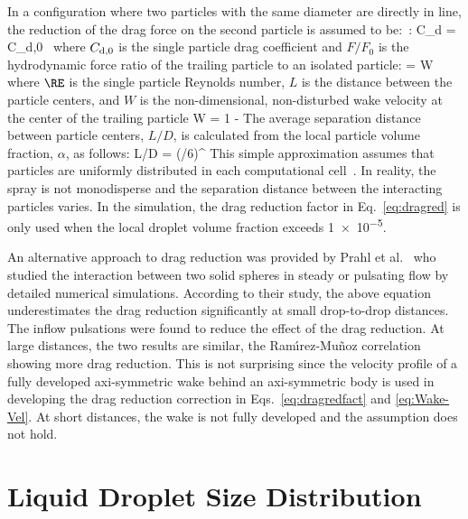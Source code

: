 In a configuration where two particles with the same diameter are directly in line, the reduction of the drag force on the second particle is assumed to be:~\cite{Ramirez:1}:
\be
  C_{\rm d} = C_{\rm d,0} \,  \label{eq:dragred}
\ee
where $C_{\rm d,0}$ is the single particle drag coefficient and $F / F_0$ is the hydrodynamic force ratio of the trailing particle to an isolated particle:
\be
   = W  \label{eq:dragredfact}
\ee
where $\RE$ is the single particle Reynolds number, $L$ is the distance between the particle centers, and $W$ is the non-dimensional, non-disturbed wake velocity at the center of the trailing particle
\be
  W = 1 -   \label{eq:Wake-Vel}
\ee
The average separation distance between particle centers, $L/D$, is calculated from the local particle volume fraction, $\alpha$, as follows:
\be
  L/D = \left(\pi/6\alpha \right)^{}
\ee
This simple approximation assumes that particles are uniformly distributed in each computational cell~\cite{Bhattacharyya2008}. In reality, the spray is not monodisperse and the separation distance between the interacting particles varies. In the simulation, the drag reduction factor in Eq.~\ref{eq:dragred} is only used when the local droplet volume fraction exceeds \num{1e-5}.

An alternative approach to drag reduction was provided by Prahl et al.~\cite{Prahl:1} who studied the interaction between two solid spheres in steady or pulsating flow by detailed numerical simulations. According to their study, the above equation underestimates the drag reduction significantly at small drop-to-drop distances. The inflow pulsations were found to reduce the effect of the drag reduction. At large distances, the two results are similar, the Ram\'{\i}rez-Mu\~{n}oz correlation showing more drag reduction. This is not surprising since the velocity profile of a fully developed axi-symmetric wake behind an axi-symmetric body is used in developing the drag reduction correction in Eqs.~\ref{eq:dragredfact} and \ref{eq:Wake-Vel}. At short distances, the wake is not fully developed and the assumption does not hold.

\section{Liquid Droplet Size Distribution}

